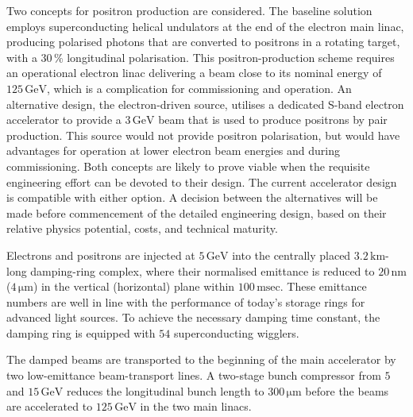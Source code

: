 \documentclass[%
 reprint,
 amsmath,amssymb,
 aps,
]{revtex4-1}
\begin{document}
Two concepts for positron production are considered.
The baseline solution employs superconducting helical undulators at
the end of the electron main linac, producing polarised photons that
are converted to positrons
in a rotating target, with a $30\,\%$
 longitudinal polarisation. 
This positron-production scheme requires an operational electron linac
delivering a beam close to its nominal energy of
$125\,{\mathrm{GeV}}$, 
which is a complication for commissioning and operation. 
An alternative design, the electron-driven source, utilises a dedicated S-band electron accelerator to provide a $3\,{\mathrm{GeV}}$ beam that is used to produce positrons by pair production.
This source would not provide positron polarisation,
but would have advantages for operation at lower electron beam energies and during commissioning.
Both concepts are
likely to prove viable when the requisite engineering effort can be devoted to their design.
The current accelerator design is compatible with either option. 
A decision between the alternatives will be made before commencement of the detailed engineering design, based on their relative physics potential, costs, and technical maturity.

Electrons and positrons are injected at $5\,{\mathrm{GeV}}$ into the
centrally placed $3.2\,{\mathrm{km}}$-long damping-ring complex, where
their normalised emittance is reduced to $20\,{\mathrm{nm}}$
($4\,{\mathrm{\mu m}}$) 
in the vertical (horizontal) plane within $100\,{\mathrm{msec}}$. 
These emittance numbers are well in line with 
the performance of today's storage rings for advanced light sources.
To achieve the necessary damping time constant,
 the damping ring is equipped with $54$ superconducting wigglers. 

The damped beams are transported to the beginning of the main
accelerator by two low-emittance beam-transport lines. A two-stage
bunch compressor from $5$ and $15\,{\mathrm{GeV}}$ reduces the
longitudinal bunch length to $300\,{\mathrm{\mu m}}$ before the beams
are accelerated to $125\,{\mathrm{GeV}}$
 in the two main linacs.
\end{document}
